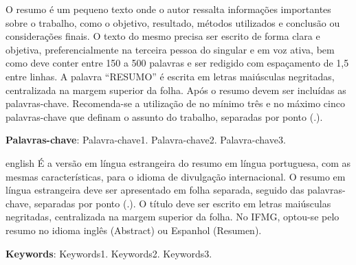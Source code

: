 
\begin{resumo}
O resumo é um pequeno texto onde o autor ressalta informações importantes sobre o
trabalho, como o objetivo, resultado, métodos utilizados e conclusão ou considerações finais.
O texto do mesmo precisa ser escrito de forma clara e objetiva, preferencialmente na terceira
pessoa do singular e em voz ativa, bem como deve conter entre 150 a 500 palavras e ser redigido com espaçamento de 1,5 entre linhas.
A palavra “RESUMO” é escrita em letras maiúsculas negritadas, centralizada na margem
superior da folha.
Após o resumo devem ser incluídas as palavras-chave. Recomenda-se a utilização de no
mínimo três e no máximo cinco palavras-chave que definam o assunto do trabalho, separadas
por ponto (.).

 \vspace{\onelineskip}
 \noindent
 \textbf{Palavras-chave}: Palavra-chave1. Palavra-chave2. Palavra-chave3. 
\end{resumo}

\begin{resumo}
 \begin{otherlanguage*}{english}
   É a versão em língua estrangeira do resumo em língua portuguesa, com as mesmas características, para o idioma de divulgação internacional. O resumo em língua estrangeira deve ser apresentado em folha separada, seguido das palavras-chave, separadas por ponto (.). 
   O título deve ser escrito em letras maiúsculas negritadas, centralizada na margem superior da folha.
   No IFMG, optou-se pelo resumo no idioma inglês (Abstract) ou Espanhol (Resumen).


   \vspace{\onelineskip}
   \noindent 
   \textbf{Keywords}: Keywords1. Keywords2. Keywords3.
 \end{otherlanguage*}
\end{resumo}